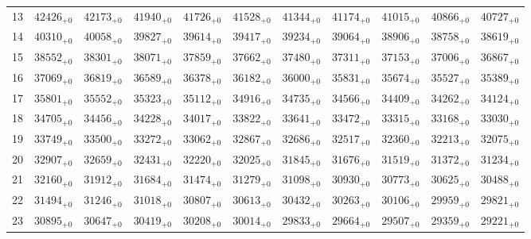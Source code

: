 \documentclass[10pt, a4paper]{article}
\begin{document}
\begin{center}
\begin{tabular}{c || c c c c c | c c c c c}
        13 & \({42426}_{+0}\) & \({42173}_{+0}\) & \({41940}_{+0}\) & \({41726}_{+0}\) & \({41528}_{+0}\) & \({41344}_{+0}\) & \({41174}_{+0}\) & \({41015}_{+0}\) & \({40866}_{+0}\) & \({40727}_{+0}\)\\
        14 & \({40310}_{+0}\) & \({40058}_{+0}\) & \({39827}_{+0}\) & \({39614}_{+0}\) & \({39417}_{+0}\) & \({39234}_{+0}\) & \({39064}_{+0}\) & \({38906}_{+0}\) & \({38758}_{+0}\) & \({38619}_{+0}\)\\
        15 & \({38552}_{+0}\) & \({38301}_{+0}\) & \({38071}_{+0}\) & \({37859}_{+0}\) & \({37662}_{+0}\) & \({37480}_{+0}\) & \({37311}_{+0}\) & \({37153}_{+0}\) & \({37006}_{+0}\) & \({36867}_{+0}\)\\
        \hline
        16 & \({37069}_{+0}\) & \({36819}_{+0}\) & \({36589}_{+0}\) & \({36378}_{+0}\) & \({36182}_{+0}\) & \({36000}_{+0}\) & \({35831}_{+0}\) & \({35674}_{+0}\) & \({35527}_{+0}\) & \({35389}_{+0}\)\\
        17 & \({35801}_{+0}\) & \({35552}_{+0}\) & \({35323}_{+0}\) & \({35112}_{+0}\) & \({34916}_{+0}\) & \({34735}_{+0}\) & \({34566}_{+0}\) & \({34409}_{+0}\) & \({34262}_{+0}\) & \({34124}_{+0}\)\\
        18 & \({34705}_{+0}\) & \({34456}_{+0}\) & \({34228}_{+0}\) & \({34017}_{+0}\) & \({33822}_{+0}\) & \({33641}_{+0}\) & \({33472}_{+0}\) & \({33315}_{+0}\) & \({33168}_{+0}\) & \({33030}_{+0}\)\\
        19 & \({33749}_{+0}\) & \({33500}_{+0}\) & \({33272}_{+0}\) & \({33062}_{+0}\) & \({32867}_{+0}\) & \({32686}_{+0}\) & \({32517}_{+0}\) & \({32360}_{+0}\) & \({32213}_{+0}\) & \({32075}_{+0}\)\\
        20 & \({32907}_{+0}\) & \({32659}_{+0}\) & \({32431}_{+0}\) & \({32220}_{+0}\) & \({32025}_{+0}\) & \({31845}_{+0}\) & \({31676}_{+0}\) & \({31519}_{+0}\) & \({31372}_{+0}\) & \({31234}_{+0}\)\\
        \hline
        21 & \({32160}_{+0}\) & \({31912}_{+0}\) & \({31684}_{+0}\) & \({31474}_{+0}\) & \({31279}_{+0}\) & \({31098}_{+0}\) & \({30930}_{+0}\) & \({30773}_{+0}\) & \({30625}_{+0}\) & \({30488}_{+0}\)\\
        22 & \({31494}_{+0}\) & \({31246}_{+0}\) & \({31018}_{+0}\) & \({30807}_{+0}\) & \({30613}_{+0}\) & \({30432}_{+0}\) & \({30263}_{+0}\) & \({30106}_{+0}\) & \({29959}_{+0}\) & \({29821}_{+0}\)\\
        23 & \({30895}_{+0}\) & \({30647}_{+0}\) & \({30419}_{+0}\) & \({30208}_{+0}\) & \({30014}_{+0}\) & \({29833}_{+0}\) & \({29664}_{+0}\) & \({29507}_{+0}\) & \({29359}_{+0}\) & \({29221}_{+0}\)\\

\end{tabular}
\end{center}
\end{document}
